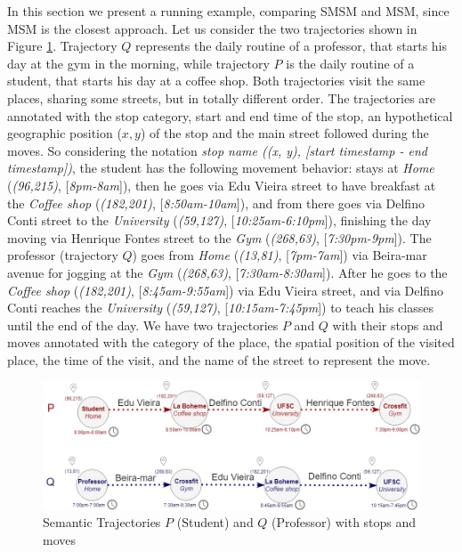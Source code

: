 In this section we present a running example, comparing SMSM and MSM, since MSM is the closest approach.
Let us consider the two trajectories shown in Figure \ref{fig:bus}. Trajectory $Q$ represents the daily routine of a professor, that starts his day at the gym in the morning, while trajectory $P$ is the daily routine of a student, that starts his day at a coffee shop. Both trajectories visit the same places, sharing some streets, but in totally different order. The trajectories are annotated with the stop category, start and end time of the stop, an hypothetical geographic position ($x, y$) of the stop and the main street followed during the moves. So considering the {notation \textit{stop name ((x, y), [start timestamp - end timestamp])}}, the student has the following movement behavior: stays at \textit{Home} (\textit{(96,215)}, [\textit{8pm-8am}]), {then} he goes via Edu Vieira street to have breakfast at the \textit{Coffee shop} (\textit{(182,201)}, [\textit{8:50am-10am}]), and from there goes via Delfino Conti street to the \textit{University} (\textit{(59,127)}, [\textit{10:25am-6:10pm}]), finishing the day moving via Henrique Fontes street to the \textit{Gym} (\textit{(268,63)}, [\textit{7:30pm-9pm}]). The professor (trajectory $Q$) goes from \textit{Home} (\textit{(13,81)}, [\textit{7pm-7am}]) via Beira-mar avenue for jogging at the \textit{Gym} (\textit{(268,63)}, [\textit{7:30am-8:30am}]). After he goes to the \textit{Coffee shop} (\textit{(182,201)}, [\textit{8:45am-9:55am}]) via Edu Vieira street, and via Delfino Conti reaches the \textit{University} (\textit{(59,127)}, [\textit{10:15am-7:45pm}]) to teach his classes until the end of the day. We have two trajectories $P$ and $Q$ with their stops and moves annotated with the category of the place, the spatial position of the visited place, the time of the visit, and the name of the street to represent the move.
\begin{figure}[h!]
\centering
\includegraphics[width=1\textwidth]{Images/running_example.jpg}
\caption{\label{fig:bus} Semantic Trajectories $P$ (Student) and $Q$ (Professor) with stops and moves}
\end{figure}


